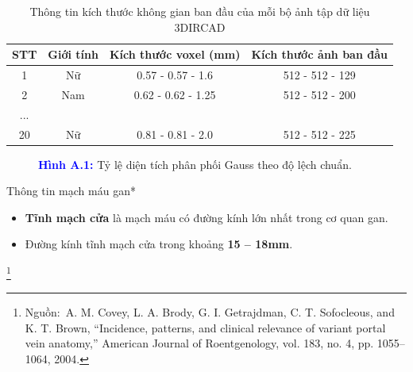 \documentclass[
	10pt,                %
	aspectratio=169,     %
]{beamer}
\begin{document}
	\begin{frame}[noframenumbering]
	    \begin{table}[H]
            \centering
            \begin{tabular}{|c|c|c|c|}
            \hline
            \textbf{STT} & \textbf{Giới tính} & \textbf{Kích thước voxel (mm)} & \textbf{Kích thước ảnh ban đầu} \\ \hline
            1   & Nữ  & 0.57 - 0.57 - 1.6  & 512 - 512 - 129 \\ \hline
            2   & Nam & 0.62 - 0.62 - 1.25 & 512 - 512 - 200 \\ \hline
            ... &     &                    &                 \\ \hline
            20  & Nữ  & 0.81 - 0.81 - 2.0  & 512 - 512 - 225 \\ \hline
            \end{tabular}
            \caption{Thông tin kích thước không gian ban đầu của mỗi bộ ảnh tập dữ liệu 3DIRCAD}
        \end{table}
	\end{frame}
	
	\begin{frame}[noframenumbering]
		\vspace{7mm}
		\begin{figure}[h!]
			
			\caption*{\textcolor{blue}{\textbf{Hình A.1:}} Tỷ lệ diện tích phân phối Gauss theo độ lệch chuẩn.}
		\end{figure}
	\end{frame}
	
	\begin{frame}[noframenumbering]
        \begin{block}{Thông tin mạch máu gan*}
			\begin{itemize}
				\item \textbf{Tĩnh mạch cửa} là mạch máu có đường kính lớn nhất trong cơ quan gan.
				\item Đường kính tĩnh mạch cửa trong khoảng \textbf{15 -- 18mm}.
			\end{itemize}
		\end{block}
	    \vspace{-10mm}\let\thefootnote\relax\footnote{\hspace{-3mm}\tiny *Nguồn:~A. M. Covey, L. A. Brody, G. I. Getrajdman, C. T. Sofocleous, and K. T. Brown, ``Incidence, patterns, and clinical relevance of variant portal vein anatomy,'' American Journal of Roentgenology, vol. 183, no. 4, pp. 1055–1064, 2004.}
    \end{frame}
\end{document}
